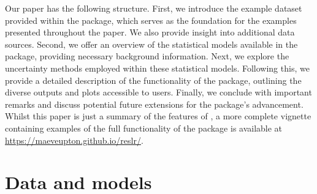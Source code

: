 Our paper has the following structure. First, we introduce the example dataset provided within the package, which serves as the foundation for the examples presented throughout the paper. We also provide insight into additional data sources. Second, we offer an overview of the statistical models available in the package, providing necessary background information. Next, we explore the uncertainty methods employed within these statistical models. Following this, we provide a detailed description of the functionality of the  package, outlining the diverse outputs and plots accessible to users. Finally, we conclude with important remarks and discuss potential future extensions for the package's advancement. Whilst this paper is just a summary of the features of , a more complete vignette containing examples of the full functionality of the package is available at \url{https://maeveupton.github.io/reslr/}.
\section{Data and models}\label{background}
